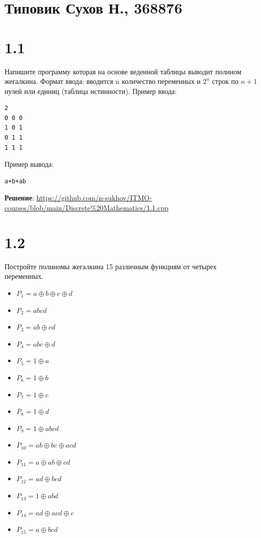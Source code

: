 \documentclass{article}
\begin{document}
\section*{Типовик Сухов Н., 368876}
\section*{1.1}
Напишите программу которая на основе веденной таблицы выводит полином жегалкина. Формат ввода: вводится n количество переменных и $2^n$ строк по $n+1$ нулей или единиц (таблица истинности).
Пример ввода:
\begin{lstlisting}[language=bash]
2
0 0 0
1 0 1
0 1 1
1 1 1
\end{lstlisting}
Пример вывода:
\begin{lstlisting}[language=bash]
a+b+ab
\end{lstlisting}
\textbf{Решение}: \url{https://github.com/n-sukhov/ITMO-courses/blob/main/Discrete%20Mathematics/1.1.cpp}

\section*{1.2}
Постройте полиномы жегалкина 15 различным функциям от четырех переменных.
\begin{itemize}
    \item $P_{1}=a\oplus b \oplus c\oplus d$
    \item $P_{2}=abcd$
    \item $P_{3}=ab\oplus cd$
    \item $P_{4}=abc\oplus d$
    \item $P_{5}=1\oplus a$
    \item $P_{6}=1\oplus b$
    \item $P_{7}=1\oplus c$
    \item $P_{8}=1\oplus d$
    \item $P_{9}=1\oplus abcd$
    \item $P_{10}=ab\oplus bc\oplus acd$
    \item $P_{11}=a\oplus ab\oplus cd$
    \item $P_{12}=ad\oplus bcd$
    \item $P_{13}=1\oplus abd$
    \item $P_{14}=ad\oplus acd\oplus c$
    \item $P_{15}=a\oplus bcd$
\end{itemize}
\end{document}
